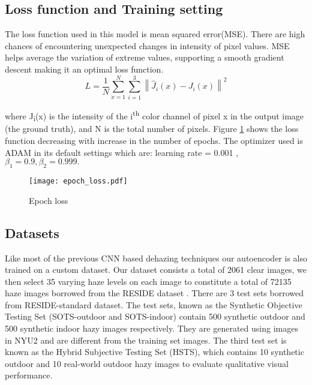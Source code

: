 \documentclass[conference]{IEEEtran}
\begin{document}
\subsection{    Loss function and Training setting}
The loss function used in this model is mean squared error(MSE). There are high chances of encountering unexpected changes in intensity of pixel values. MSE helps average the variation of extreme values, supporting a smooth gradient descent making it an optimal loss function. 
\begin{equation}
L=\frac{1}{N}\sum_{x=1}^{N}\sum_{i=1}^{3}\left \| \hat{J}_{i}\left ( x \right )-J_{i}\left ( x \right ) \right \|^{2}
\end{equation}

where J\textsubscript{i}(x) is the intensity of the i\textsuperscript{th} color channel of pixel x in the output image (the ground truth), and N is the total number of pixels. Figure \ref{fig:loss} shows the loss function decreasing with increase in the number of epochs.
\newline
The optimizer used is ADAM \cite{kingma2014adam} in its default settings which are: learning rate = 0.001 , 
$ \beta_{1}=0.9 , \beta_{2}=0.999.$ 

\begin{figure}[ht]
\centering
\captionsetup{justification=centering}
\centerline{\texttt{[image: epoch\_loss.pdf]}}
\caption{Epoch loss} 
\label{fig:loss}
\end{figure} 

\subsection{    Datasets}
Like most of the previous CNN based dehazing techniques our autoencoder is also trained on a custom dataset. Our dataset consists a total of 2061 clear images, we then select 35 varying haze levels on each image to constitute a total of 72135 haze images borrowed from the RESIDE dataset \cite{li2019benchmarking}.
\newline
There are 3 test sets borrowed from RESIDE-standard \cite{li2019benchmarking} dataset. The test sets, known as the Synthetic Objective Testing Set (SOTS-outdoor and SOTS-indoor) contain 500 synthetic outdoor and 500 synthetic indoor hazy images respectively. They are generated using images in NYU2 and are different from the training set images. The third test set is known as the Hybrid Subjective Testing Set (HSTS), which contains 10 synthetic outdoor and 10 real-world outdoor hazy images to evaluate qualitative visual performance.
\newline
\end{document}
